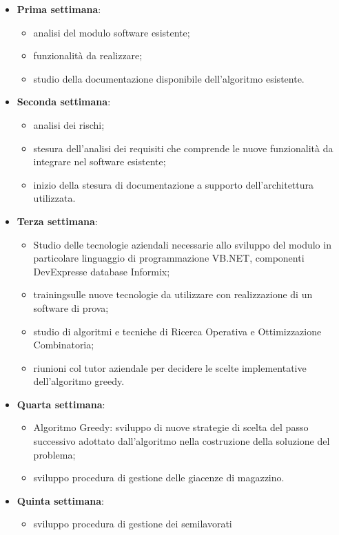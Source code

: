 \begin{itemize}
	\item \textbf{Prima settimana}:
	\begin{itemize}
		 \item analisi del modulo software esistente;
		 \item funzionalità da realizzare;
	 	 \item studio della documentazione disponibile dell’algoritmo esistente.
	\end{itemize}
	\item \textbf{Seconda settimana}: 
	\begin{itemize}
		\item analisi dei rischi;
		\item stesura dell'analisi dei requisiti che comprende le nuove funzionalità da integrare nel software esistente;
		\item  inizio della stesura di documentazione a supporto dell'architettura utilizzata.
	\end{itemize}
	\item \textbf{Terza settimana}:
		\begin{itemize}
		\item Studio delle tecnologie aziendali necessarie allo sviluppo del
		modulo in particolare linguaggio di programmazione VB.NET\glo, componenti
		DevExpress\glo e database Informix\glo;
		\item  training\glosp sulle nuove tecnologie da utilizzare con realizzazione di un software di prova;
		\item studio di algoritmi e tecniche di Ricerca Operativa e	Ottimizzazione Combinatoria;
		\item riunioni col tutor aziendale per decidere le scelte implementative dell'algoritmo greedy.
	\end{itemize}
	\item \textbf{Quarta settimana}:
		\begin{itemize}
		\item Algoritmo Greedy: sviluppo di nuove strategie di scelta
		del passo successivo adottato dall’algoritmo nella
		costruzione della soluzione del problema;
		\item sviluppo procedura di gestione delle giacenze di
		magazzino.
		\end{itemize}
	\item \textbf{Quinta settimana}:
		\begin{itemize}
		\item sviluppo procedura di gestione dei semilavorati

\end{itemize}
\end{itemize}
